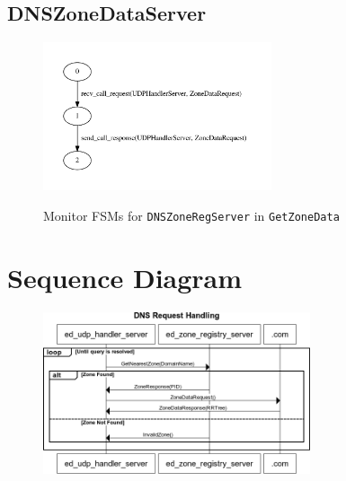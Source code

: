\documentclass[a4paper]{article}
\begin{document}
\subsection{DNSZoneDataServer}
\begin{figure}[H]
\centering
\includegraphics[width=0.6\textwidth]{getzonedata_zonedataserver_dot.pdf}
\label{fsm-zonedataserver}
\caption{Monitor FSMs for \texttt{DNSZoneRegServer} in \texttt{GetZoneData}}
\end{figure}


\section{Sequence Diagram}

\begin{figure}[H]
\centering
\includegraphics[width=0.7\textwidth]{DNSServer-Messages.png}
\end{figure}



\end{document}
